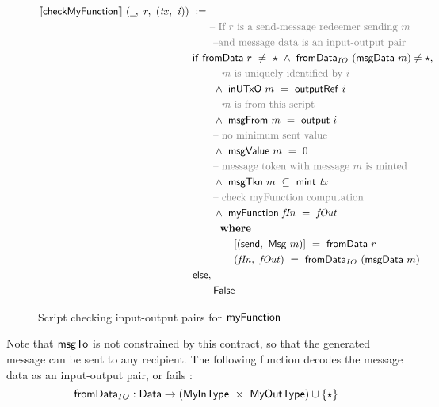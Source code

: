 \begin{figure}[htb]
  \begin{align*}
    \applyScript{\mathsf{checkMyFunction}}~(\wcard,~r,~(\var{tx},~\var{i}))~&\leteq~\\
    &~~~~~\text{\textcolor{gray}{-- If $r$ is a send-message redeemer sending $m$}} \\
    &~~~~~~\text{\textcolor{gray}{--and message data is an input-output pair}} \\
    & \fun{if }~ \fun{fromData}~r~\neq~\emptytype~ \wedge ~\fun{fromData}_{IO}~(\fun{msgData}~m) \neq \emptytype,~\\
    &~~~~~~\text{\textcolor{gray}{-- $m$ is uniquely identified by $i$}} \\
    &~~~~~~\wedge~\fun{inUTxO}~m~=~\outputref~i \\
    &~~~~~~\text{\textcolor{gray}{-- $m$ is from this script}} \\
    &~~~~~~\wedge~ \fun{msgFrom}~m~=~\fun{output}~i \\
    &~~~~~~\text{\textcolor{gray}{-- no minimum sent value}} \\
    &~~~~~~\wedge~\fun{msgValue}~m~=~0 \\
    &~~~~~~\text{\textcolor{gray}{-- message token with message $m$ is minted}} \\
    &~~~~~~\wedge~\msgTkn~m~\subseteq~\mint~\var{tx} \\
    &~~~~~~\text{\textcolor{gray}{-- check myFunction computation}} \\
    &~~~~~~\wedge~\fun{myFunction}~\var{fIn}~=~\var{fOut} \\
    &~~~~~~\where \\
    &~~~~~~~~~~~ ~[(\send,~\Msg~m)] ~=~\fun{fromData}~r \\
    &~~~~~~~~~~~ ~(\var{fIn},~\var{fOut}) ~=~\fun{fromData}_{IO}~(\fun{msgData}~m) \\
    & \fun{else, } \\
    &~~~~~~\False
  \end{align*}
  \caption{Script checking input-output pairs for $\mathsf{myFunction}$}
  \label{fig:checkmf}
\end{figure}

Note that $\mathsf{msgTo}$ is not constrained by this contract, so that the generated
message can be sent to any recipient.
The following function decodes the message data as an input-output pair, or fails :
\[ \mathsf{fromData}_{IO} : \textsf{Data} \to (\mathsf{MyInType}~\times~ \mathsf{MyOutType})\cup \{\star\} \]

